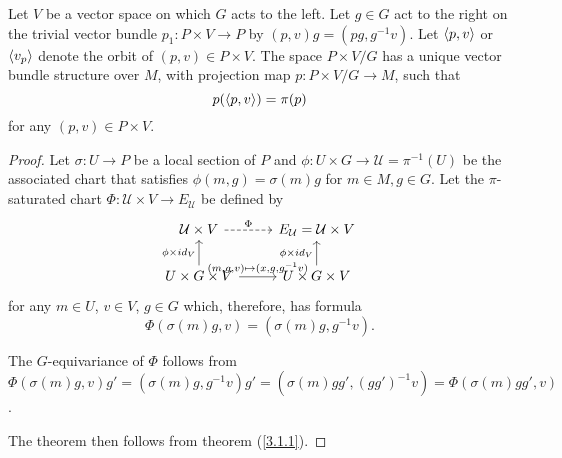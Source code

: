 
\begin{proposition} \label{propAssociatedExists}
    Let $V$ be a vector space on which $G$ acts to the left. Let $g \in G$ act to the right on the trivial vector bundle $p_1 :P \times V \to P$ by $(p, v)g = (pg, g^{-1}v)$. Let $\left\langle p, v \right\rangle$ or $\left\langle v_p \right\rangle$ denote the orbit of $(p, v) \in P \times V$. The space $P \times V/G$ has a unique vector bundle structure over $M$, with projection map $p: P \times V / G \to M$, such that \begin{equation}
        p(\left\langle p, v \right\rangle) = \pi(p)
    \end{equation} for any $(p, v) \in P \times V$.

\end{proposition}

\begin{proof}
Let $\sigma: U \to P$ be a local section of $P$ and $\phi: U \times G \to \mathcal U = \pi^{-1}(U)$ be the associated chart that satisfies $\phi(m, g) = \sigma(m)g$ for $m \in M, g \in G$. Let the $\pi$-saturated chart $\Phi: \mathcal U \times V \to E_{\mathcal U}$ be defined by
\begin{equation*}
    \begin{tikzcd}
        \mathcal U \times V \arrow[dashed]{r}{\Phi} & E_{\mathcal U} = \mathcal U \times V \\
        U \times G \times V \arrow{u}{\phi \times id_V} \arrow{r}{(m, g, v) \mapsto (x, g, g^{-1}v)}    & U \times G \times V \arrow{u}{\phi \times id_V}
    \end{tikzcd}
\end{equation*}
for any $m \in U$, $v \in V$, $g \in G$ which, therefore, has formula
\[
    \Phi(\sigma(m)g, v) = (\sigma(m)g, g^{-1}v).
\]

The $G$-equivariance of $\Phi$ follows from $\Phi(\sigma(m)g, v)g' = (\sigma(m)g, g^{-1}v)g' = (\sigma(m)gg', (gg')^{-1}v) = \Phi(\sigma(m)gg', v)$.

The theorem then follows from theorem (\ref{3.1.1}).
\end{proof}


